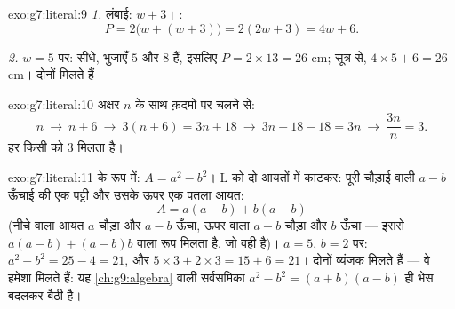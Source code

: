 \begin{solution}{exo:g7:literal:9}
\emph{1.} लंबाई: $w + 3$। :
\[
P = 2\bigl(w + (w + 3)\bigr) = 2(2w + 3) = 4w + 6 .
\]

\emph{2.} $w = 5$ पर: सीधे, भुजाएँ $5$ और $8$ हैं, इसलिए
$P = 2 \times 13 = 26$ cm; सूत्र से, $4 \times 5 + 6 = 26$ cm।
दोनों मिलते हैं।
\end{solution}

\begin{solution}{exo:g7:literal:10}
अक्षर $n$ के साथ क़दमों पर चलने से:
\[
n \ \to\ n + 6 \ \to\ 3(n + 6) = 3n + 18 \ \to\ 3n + 18 - 18 = 3n
\ \to\ \frac{3n}{n} = 3 .
\]
हर किसी को $3$ मिलता है।
\end{solution}

\begin{solution}{exo:g7:literal:11}
 के रूप में: $A = a^2 - b^2$। L को दो आयतों में काटकर: पूरी
चौड़ाई वाली $a - b$ ऊँचाई की एक पट्टी और उसके ऊपर एक पतला आयत:
\[
A = a(a - b) + b(a - b)
\]
(नीचे वाला आयत $a$ चौड़ा और $a - b$ ऊँचा, ऊपर वाला $a - b$ चौड़ा
और $b$ ऊँचा --- इससे $a(a-b) + (a-b)b$ वाला रूप मिलता है, जो वही
है)। $a = 5$, $b = 2$ पर: $a^2 - b^2 = 25 - 4 = 21$, और
$5 \times 3 + 2 \times 3 = 15 + 6 = 21$। दोनों व्यंजक मिलते हैं
--- वे हमेशा मिलते हैं: यह \cref{ch:g9:algebra} वाली सर्वसमिका
$a^2 - b^2 = (a + b)(a - b)$ ही भेस बदलकर बैठी है।
\end{solution}

